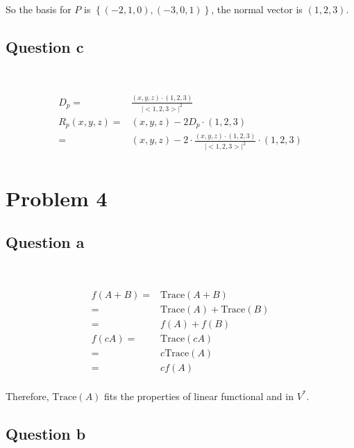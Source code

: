 \documentclass{article}
\def\Trace{\text{Trace}}
\begin{document}
So the basis for $P$ is $\left\{(-2,1,0),(-3,0,1)\right\}$, the normal vector is $(1,2,3)$.

\subsection{Question c}

~

\begin{equation*}
\begin{split}
D_p=&\frac{(x,y,z)\cdot(1,2,3)}{\lvert<1,2,3>\rvert^2}\\
R_p(x,y,z)=&(x,y,z)-2D_p\cdot(1,2,3)\\
=&(x,y,z)-2\cdot\frac{(x,y,z)\cdot(1,2,3)}{\lvert<1,2,3>\rvert^2}\cdot(1,2,3)\\
\end{split}
\end{equation*}

\newpage

\section{Problem 4}

\subsection{Question a}

~

\begin{equation*}
\begin{split}
f(A+B)=&\Trace(A+B)\\
=&\Trace(A)+\Trace(B)\\
=&f(A)+f(B)\\
f(cA)=&\Trace(cA)\\
=&c\Trace(A)\\
=&cf(A)\\
\end{split}
\end{equation*}

Therefore, $\Trace(A)$ fits the properties of linear functional and in $V^*$.

\subsection{Question b}

~
\end{document}
